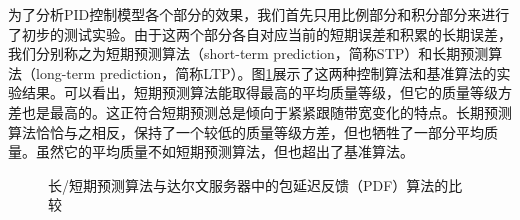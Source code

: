 为了分析PID控制模型各个部分的效果，我们首先只用比例部分和积分部分来进行了初步的测试实验。由于这两个部分各自对应当前的短期误差和积累的长期误差，我们分别称之为短期预测算法（short-term prediction，简称STP）和长期预测算法（long-term prediction，简称LTP）。图\ref{fig:performance-all}展示了这两种控制算法和基准算法的实验结果。可以看出，短期预测算法能取得最高的平均质量等级，但它的质量等级方差也是最高的。这正符合短期预测总是倾向于紧紧跟随带宽变化的特点。长期预测算法恰恰与之相反，保持了一个较低的质量等级方差，但也牺牲了一部分平均质量。虽然它的平均质量不如短期预测算法，但也超出了基准算法。

\begin{figure}[t]
\centering
{}
\caption{长/短期预测算法与达尔文服务器中的包延迟反馈（PDF）算法的比较}
\label{fig:performance-all}
\end{figure}

